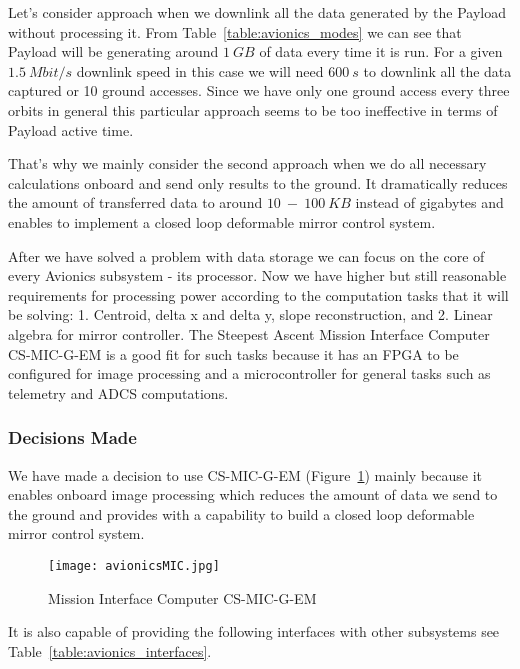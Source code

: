 \documentclass[12pt]{article}
\begin{document}
Let’s consider approach when we downlink all the data generated by the Payload without processing it. From Table~\ref{table:avionics_modes} we can see that Payload will be generating around $1\ GB$ of data every time it is run. For a given $1.5\ Mbit/s$ downlink speed in this case we will need $600\ s$ to downlink all the data captured or 10 ground accesses. Since we have only one ground access every three orbits in general this particular approach seems to be too ineffective in terms of Payload active time. 

That’s why we mainly consider the second approach when we do all necessary calculations onboard and send only results to the ground. It dramatically reduces the amount of transferred data to around $10\ -\ 100\ KB$ instead of gigabytes and enables to implement a closed loop deformable mirror control system.

After we have solved a problem with data storage we can focus on the core of every Avionics subsystem - its processor. Now we have higher but still reasonable requirements for processing power according to the computation tasks that it will be solving: 1. Centroid, delta x and delta y, slope reconstruction, and 2. Linear algebra for mirror controller.
The Steepest Ascent Mission Interface Computer CS-MIC-G-EM is a good fit for such tasks because it has an FPGA to be configured for image processing and a microcontroller for general tasks such as telemetry and ADCS computations.

\subsubsection{Decisions Made}

We have made a decision to use CS-MIC-G-EM (Figure~\ref{fig:avionics_MIC}) mainly because it enables onboard image processing which reduces the amount of data we send to the ground and provides with a capability to build a closed loop deformable mirror control system.

\begin{figure}[ht]\label{fig:avionics_MIC}
\centering
  \texttt{[image: avionicsMIC.jpg]}
\caption{Mission Interface Computer CS-MIC-G-EM \cite{avionics_clyde_space}}
\end{figure}

It is also capable of providing the following interfaces with other subsystems see Table~\ref{table:avionics_interfaces}.
\end{document}
